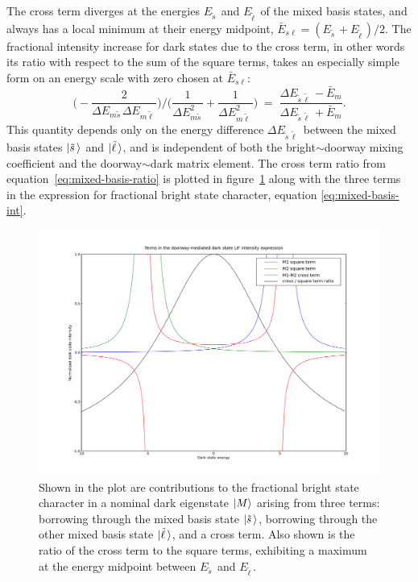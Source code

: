\documentclass[12pt]{mitthesis}
\newcommand{\ts}{\tilde{s}\,}
\newcommand{\tl}{\tilde{\ell}\,}
\begin{document}
The cross term diverges at the energies $E_{\ts}$ and $E_{\tl}$ of the
mixed basis states, and always has a local minimum at their energy
midpoint, $\bar{E}_{s \ell} = (E_{\ts} + E_{\tl})/2$. The fractional
intensity increase for dark states due to the cross term, in other
words its ratio with respect to the sum of the square terms, takes an
especially simple form on an energy scale with zero chosen at
$\bar{E}_{s \ell}$:
\begin{equation}
  \label{eq:mixed-basis-ratio}
  \biggl( - \frac{2}{\Delta E_{m \ts} \Delta E_{m \tl}} \biggr) / 
  \biggl( \frac{1}{\Delta E_{m \ts}^2} +\frac{1}{\Delta E_{m \tl}^2} \biggr)
  \; = \; \frac{\Delta E_{\ts \tl} - \bar{E}_m}{\Delta E_{\ts \tl} + \bar{E}_m}.
\end{equation}
This quantity depends only on the energy difference $\Delta
E_{\ts\tl}$ between the mixed basis states $\ket{\ts}$ and
$\ket{\tl}$, and is independent of both the bright$\sim$doorway mixing
coefficient and the doorway$\sim$dark matrix element.  The cross term
ratio from equation~\ref{eq:mixed-basis-ratio} is plotted in
figure~\ref{fig:local-cross-term} along with the three terms in the
expression for fractional bright state character, equation
\ref{eq:mixed-basis-int}.

\begin{figure}
  \caption{Shown in the plot are contributions to the fractional
    bright state character in a nominal dark eigenstate $\mathinner{|{M}\rangle}$
    arising from three terms: borrowing through the mixed basis state
    $\ket{\ts}$, borrowing through the other mixed basis state
    $\ket{\tl}$, and a cross term.  Also shown is the ratio of the
    cross term to the square terms, exhibiting a maximum at the energy
    midpoint between $E_{\ts}$ and $E_{\tl}$.}
  \label{fig:local-cross-term}
  \includegraphics[width=6.4in]{local-doorway-terms.png}
\end{figure}
\end{document}
